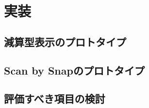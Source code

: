 \chapter{実装}
\label{chapter:proposal}

\section{減算型表示のプロトタイプ}

\section{Scan by Snapのプロトタイプ}

\section{評価すべき項目の検討}